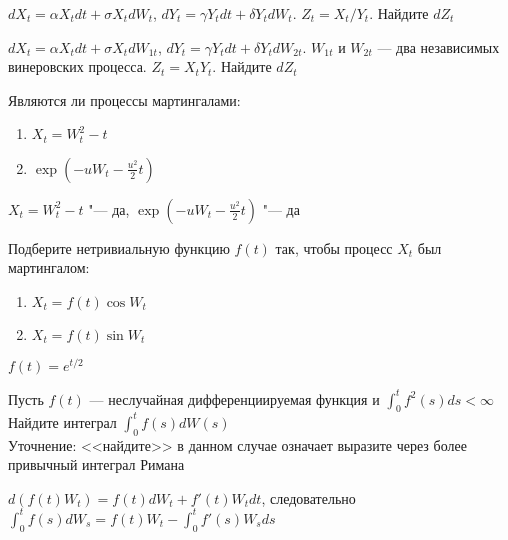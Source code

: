 \begin{problem}
 $dX_{t}=\alpha X_{t}dt+\sigma X_{t}dW_{t}$, $dY_{t}=\gamma Y_{t}dt+\delta Y_{t}dW_{t}$. $Z_{t}=X_{t}/Y_{t}$. Найдите $dZ_{t}$ 
\end{problem} 
\begin{solution} 

\end{solution}

\begin{problem}
 $dX_{t}=\alpha X_{t}dt+\sigma X_{t}dW_{1t}$, $dY_{t}=\gamma Y_{t}dt+\delta Y_{t}dW_{2t}$. $W_{1t}$ и $W_{2t}$ --- два независимых винеровских процесса. $Z_{t}=X_{t}Y_{t}$. Найдите $dZ_{t}$ 
\end{problem} 
\begin{solution} 

\end{solution}

\begin{problem}
Являются ли процессы мартингалами: 
\begin{enumerate}
\item $X_{t}=W_{t}^{2}-t$ 
\item  $\exp(-uW_{t}-\frac{u^{2}}{2}t)$ 
\end{enumerate}
\end{problem} 

\begin{solution} 
$X_{t}=W_{t}^{2}-t$ "--- да, $\exp(-uW_{t}-\frac{u^{2}}{2}t)$ "--- да
\end{solution}

\begin{problem}
Подберите нетривиальную функцию $f(t)$ так, чтобы процесс $X_t$ был мартингалом:
\begin{enumerate}
\item $X_t=f(t) \cos W_t$
\item $X_t=f(t) \sin W_t$
\end{enumerate}
\end{problem}

\begin{solution}
$f(t)=e^{t/2}$
\end{solution}




\begin{problem}
Пусть $f(t)$ --- неслучайная дифференциируемая функция и $\int_{0}^{t}f^{2}(s)ds<\infty$ \\
Найдите интеграл $\int_{0}^{t}f(s)dW(s)$ \\
Уточнение: <<найдите>> в данном случае означает выразите через более привычный интеграл Римана 
\end{problem} 
\begin{solution} 
 $d(f(t)W_t)=f(t)dW_t+f'(t)W_tdt$, следовательно $\int_0^t f(s)dW_s=f(t)W_t-\int_0^t f'(s)W_sds$ 
\end{solution}


